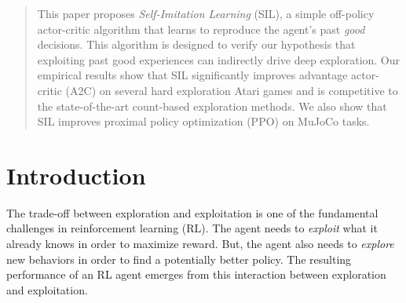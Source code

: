 \documentclass{article}
\begin{document}





\printAffiliationsAndNotice{\icmlEqualContribution} 

\begin{abstract}
This paper proposes \textit{Self-Imitation Learning} (SIL), a simple off-policy actor-critic algorithm that learns to reproduce the agent's past {\em good} decisions. This algorithm is designed to verify our hypothesis that exploiting past good experiences can indirectly drive deep exploration. Our empirical results show that SIL significantly improves advantage actor-critic (A2C) on several hard exploration Atari games and is competitive to the state-of-the-art count-based exploration methods. We also show that SIL improves proximal policy optimization (PPO) on MuJoCo tasks.
\end{abstract}

\section{Introduction} \label{sec:intro}
\cutsectiondown
The trade-off between exploration and exploitation is one of the fundamental challenges in reinforcement learning (RL). The agent needs to \textit{exploit} what it already knows in order to maximize reward. But, the agent also needs to \textit{explore} new behaviors in order to find a potentially better policy. The resulting performance of an RL agent emerges from this interaction between exploration and exploitation.
\end{document}
